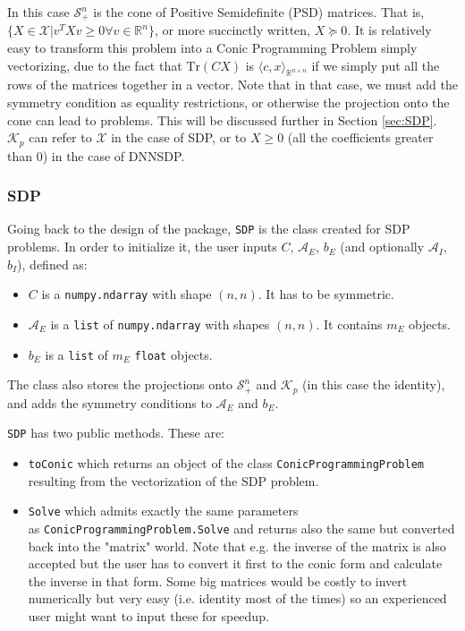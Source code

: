 \documentclass[paper=a4, fontsize=11pt]{scrartcl}
\numberwithin{equation}{section}		%
\numberwithin{figure}{section}			%
\numberwithin{table}{section}				%
\begin{document}
In this case $\mathcal{S}^n_+$ is the cone of Positive Semidefinite (PSD) matrices. That is, $\{X\in\mathcal{X} | v^T X v \geq 0 \forall v \in \mathbb{R}^n\}$, or more succinctly written, $X\succeq 0$. It is relatively easy to transform this problem into a Conic Programming Problem simply vectorizing, due to the fact that $\text{Tr}(CX)$ is $\langle c, x \rangle _{\mathbb{R}^{n\times n}}$ if we simply put all the rows of the matrices together in a vector. Note that in that case, we must add the symmetry condition as equality restrictions, or otherwise the projection onto the cone can lead to problems. This will be discussed further in Section \ref{sec:SDP}. $\mathcal{K}_p$ can refer to $\mathcal{X}$ in the case of SDP, or to $X\geq 0$ (all the coefficients greater than $0$) in the case of DNNSDP. 
\subsubsection{SDP}
Going back to the design of the package, \texttt{SDP} is the class created for SDP problems. In order to initialize it, the user inputs $C$, $\mathcal{A}_E$, $b_E$ (and optionally $\mathcal{A}_I$, $b_I$), defined as:
\begin{itemize}
\item $C$ is a \texttt{numpy.ndarray} with shape $(n,n)$. It has to be symmetric.
\item $\mathcal{A}_E$ is a \texttt{list} of \texttt{numpy.ndarray} with shapes $(n,n)$. It contains $m_E$ objects.
\item $b_E$ is a \texttt{list} of $m_E$ \texttt{float} objects.
\end{itemize}

The class also stores the projections onto $\mathcal{S}^n_+$ and $\mathcal{K}_p$ (in this case the identity), and adds the symmetry conditions to $\mathcal{A}_E$ and $b_E$.

\texttt{SDP} has two public methods. These are:
\begin{itemize}
\item \texttt{toConic} which returns an object of the class \texttt{ConicProgrammingProblem} resulting from the vectorization of the SDP problem.
\item \texttt{Solve} which admits exactly the same parameters\\ as \texttt{ConicProgrammingProblem.Solve} and returns also the same but converted back into the "matrix" world. Note that e.g. the inverse of the matrix is also accepted but the user has to convert it first to the conic form and calculate the inverse in that form. Some big matrices would be costly to invert numerically but very easy (i.e. identity most of the times) so an experienced user might want to input these for speedup.
\end{itemize}
\end{document}
